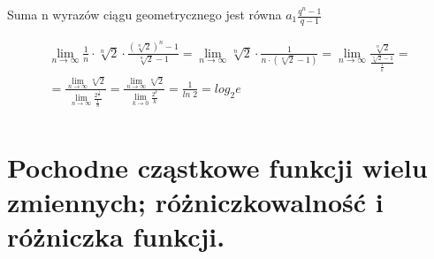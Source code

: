 \documentclass[main.tex]{subfiles}
\begin{document}
    Suma n wyrazów ciągu geometrycznego jest równa $a_1 \frac{q^n - 1}{q - 1}$

    \begin{gather*}
        \lim_{n \rightarrow \infty} \frac{1}{n} \cdot \sqrt[n]{2} \cdot \frac{(\sqrt[n]{2})^n - 1}{\sqrt[n]{2} - 1} =
        \lim_{n \rightarrow \infty} \sqrt[n]{2} \cdot \frac{1}{n \cdot (\sqrt[n]{2} - 1)} =
        \lim_{n \rightarrow \infty} \frac{\sqrt[n]{2}}{\frac{\sqrt[n]{2} - 1}{\frac{1}{n}}} =\\
        = \frac{\lim_{n \rightarrow \infty} \sqrt[n]{2}}{\lim_{n \rightarrow \infty} \frac{2^{\frac{1}{n}}}{\frac{1}{n}}} =
        \frac{\lim_{n \rightarrow \infty} \sqrt[n]{2}}{\lim_{k \rightarrow 0} \frac{2^{k}}{k}} =
        \frac{1}{ln\; 2} = log_2e\\
    \end{gather*}
    \newpage

    \section{Pochodne cząstkowe funkcji wielu zmiennych; różniczkowalność i różniczka funkcji.}
\end{document}
